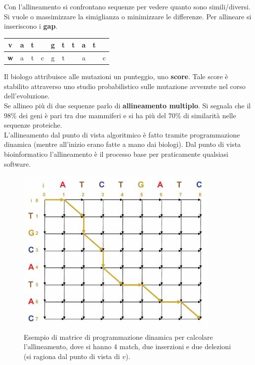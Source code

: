 \documentclass[a4paper,12pt, oneside]{book}
\begin{document}
Con l'allineamento si confrontano sequenze per vedere quanto sono
simili/diversi. Si vuole o massimizzare la simiglianza o minimizzare le
differenze. Per allineare si inseriscono i \textbf{gap}.
\begin{table}[H]
  \centering
  \begin{tabular}{c||c|c|c|c|c|c|c|c|c}
    \hline
    \textbf{v}& a& t & & g& t & t& a & t &\\
    \hline
    \textbf{w}& a& t &c & g& t & & a &  &c\\
    \hline
  \end{tabular}
\end{table}
Il biologo attribuisce alle mutazioni un punteggio, uno \textbf{score}. Tale
score è stabilito attraverso uno studio probabilistico sulle mutazione avvenute
nel corso dell'evoluzione.\\
Se allineo più di due sequenze parlo di \textbf{allineamento multiplo}. Si
segnala che il 98\% dei geni è pari tra due mammiferi e si ha più del 70\% di
similarità nelle sequenze proteiche.\\
L'allineamento dal punto di vista algoritmico è fatto tramite programmazione
dinamica (mentre all'inizio erano fatte a mano dai biologi). Dal punto di vista
bioinformatico l'allineamento è il processo base per praticamente qualsiasi
software.
\begin{figure}
  \centering
  \includegraphics[scale = 0.6]{img/almat.jpg}
  \caption{Esempio di matrice di programmazione dinamica per calcolare
    l'allineamento, dove si hanno 4 match, due inserzioni e due delezioni (si
    ragiona dal punto di vista di $v$).} 
\end{figure}
\end{document}
